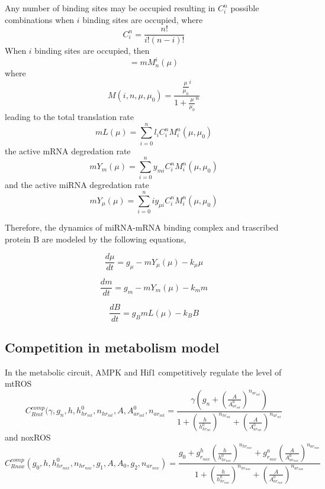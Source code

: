 \documentclass{article}
\begin{document}
Any number of binding sites may be occupied resulting in $C_i^n$ possible combinations  when $i$ binding sites are occupied, where
%
\begin{equation}
C_i^n = \frac{n!}{i!(n-i)!}
\end{equation}
%
When $i$ binding sites are occupied, then%
\begin{equation}
[m_i] = m M_n^i (\mu)
\end{equation}
%
where%
%
\begin{equation}
M(i, n, \mu, \mu_0)= \frac{\frac{\mu}{\mu_0}^{i}}{1+\frac{\mu}{\mu_0}^n}
\end{equation}
%
leading to the total translation rate %
\begin{equation}
mL(\mu) = \sum_{i=0}^{n}l_{i}C_i^nM_i^n(\mu,\mu_0)
 \end{equation}
the active mRNA degredation rate%
\begin{equation}
        m Y_m (\mu) = \sum_{i=0}^{n}y_{mi}C_i^nM_i^n(\mu,\mu_0)
 \end{equation}
 and the active miRNA degredation rate%
\begin{equation}
                m Y_\mu(\mu) = \sum_{i=0}^{n}i y_{\mu i}C_i^nM_i^n(\mu,\mu_0)
\end{equation}

Therefore, the dynamics of miRNA-mRNA binding complex and trascribed protein B are modeled by the following equations, 

\begin{equation}
\frac{d\mu}{dt} = g_\mu - mY_\mu (\mu) -k_\mu \mu
\end{equation}

\begin{equation}
\frac{dm}{dt} = g_m - mY_m(\mu) - k_m m
\end{equation}

\begin{equation}
\frac{dB}{dt} = g_B mL(\mu)-k_B B
\end{equation}

\FloatBarrier
\subsection{Competition in metabolism model}

In the metabolic circuit, AMPK and Hif1 competitively regulate the level of mtROS
\begin{equation}
        C^{comp}_{Rmt}(\gamma,g_n,h,h^0_{hr_{mt}},n_{hr_{mt}},A,A^0_{ar_{mt}},n_{ar_{mt}} = \frac{\gamma (g_n+(\frac{A}{A^0_{ar_{mt}}})^{n_{ar_{mt}}})} {1+(\frac{h}{h^0_{hr_{mt}}})^{n_{hr_{mt}}}+(\frac{A}{A^0_{ar_{mt}}})^{n_{ar_{mt}}}}
\end{equation}
 and noxROS
\begin{equation}
        C^{comp}_{Rnox}(g_0,h,h^0_{hr_{nox}},n_{hr_{nox}},g_1,A,A_0,g_2,n_{ar_{nox}})=\frac{g_0+g^h_{r_{nox}}(\frac{h}{h^0_{hr_{nox}}})^{n_{hr_{nox}}}+g^a_{r_{nox}}(\frac{A}{A^0_{ar_{nox}}})^{n_{ar_{nox}}}}{1+(\frac{h}{h^0_{hr_{nox}}})^{n_{hr_{nox}}}+(\frac{A}{A^0_{ar_{nox}}})^{n_{ar_{nox}}}}
\end{equation}
\end{document}

